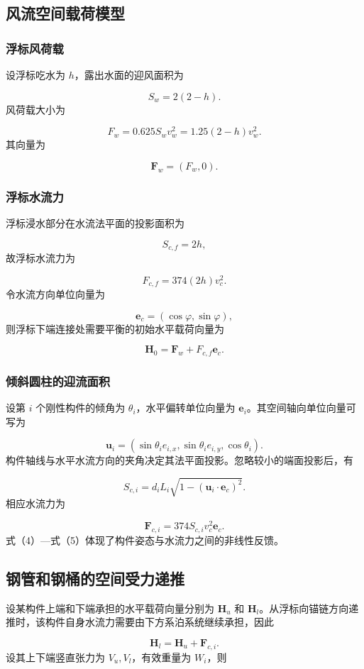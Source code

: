 \subsection{风流空间载荷模型}
\subsubsection{浮标风荷载}
设浮标吃水为 \(h\)，露出水面的迎风面积为

\[
S_w=2(2-h).
\]
风荷载大小为

\[
F_w=0.625S_wv_w^2
=1.25(2-h)v_w^2. \tag{1}
\]
其向量为

\[
\boldsymbol F_w=(F_w,0).
\]
\subsubsection{浮标水流力}
浮标浸水部分在水流法平面的投影面积为

\[
S_{c,f}=2h,
\]
故浮标水流力为

\[
F_{c,f}=374(2h)v_c^2. \tag{2}
\]
令水流方向单位向量为

\[
\boldsymbol e_c=(\cos\varphi,\sin\varphi),
\]
则浮标下端连接处需要平衡的初始水平载荷向量为

\[
\boldsymbol H_0
=\boldsymbol F_w+F_{c,f}\boldsymbol e_c. \tag{3}
\]
\subsubsection{倾斜圆柱的迎流面积}
设第 \(i\) 个刚性构件的倾角为 \(\theta_i\)，水平偏转单位向量为 \(\boldsymbol e_i\)。其空间轴向单位向量可写为

\[
\boldsymbol u_i=
(\sin\theta_i e_{i,x},
\sin\theta_i e_{i,y},
\cos\theta_i).
\]
构件轴线与水平水流方向的夹角决定其法平面投影。忽略较小的端面投影后，有

\[
S_{c,i}=d_iL_i
\sqrt{1-(\boldsymbol u_i\cdot\boldsymbol e_c)^2}. \tag{4}
\]
相应水流力为

\[
\boldsymbol F_{c,i}
=374S_{c,i}v_c^2\boldsymbol e_c. \tag{5}
\]
式（4）—式（5）体现了构件姿态与水流力之间的非线性反馈。

\subsection{钢管和钢桶的空间受力递推}
设某构件上端和下端承担的水平载荷向量分别为 \(\boldsymbol H_u\) 和 \(\boldsymbol H_l\)。从浮标向锚链方向递推时，该构件自身水流力需要由下方系泊系统继续承担，因此

\[
\boldsymbol H_l
=\boldsymbol H_u+\boldsymbol F_{c,i}. \tag{6}
\]
设其上下端竖直张力为 \(V_u,V_l\)，有效重量为 \(W_i\)，则

